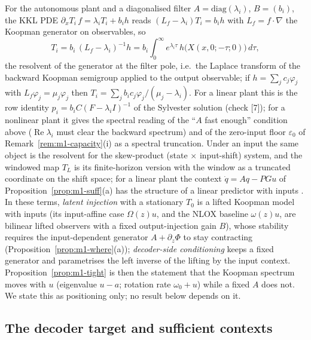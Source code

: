 \begin{remark}\label{rem:m1-koopman}
For the autonomous plant and a diagonalised filter $A=\mathrm{diag}(\lambda_i)$, $B=(b_i)$, the KKL PDE
$\partial_xT_i\,f=\lambda_iT_i+b_ih$ reads $(L_f-\lambda_i)T_i=b_ih$ with $L_f=f\cdot\nabla$ the Koopman generator on
observables, so
\[
T_i=b_i\,(L_f-\lambda_i)^{-1}h=b_i\int_0^\infty e^{\lambda_i\tau}\,h\big(X(x,0;-\tau;0)\big)\,d\tau ,
\]
the resolvent of the generator at the filter pole, i.e.\ the Laplace transform of the backward Koopman semigroup
applied to the output observable; if $h=\sum_jc_j\varphi_j$ with $L_f\varphi_j=\mu_j\varphi_j$ then
$T_i=\sum_jb_ic_j\varphi_j/(\mu_j-\lambda_i)$. For a linear plant this is the row identity
$p_i=b_iC(F-\lambda_iI)^{-1}$ of the Sylvester solution (check [7]); for a nonlinear plant it gives the spectral
reading of the ``$A$ fast enough'' condition above ($\operatorname{Re}\lambda_i$ must clear the backward spectrum) and of
the zero-input floor $\varepsilon_0$ of Remark~\ref{rem:m1-capacity}(i) as a spectral truncation. Under an input the
same object is the resolvent for the skew-product (state $\times$ input-shift) system, and the windowed map $T_L$ is its
finite-horizon version with the window as a truncated coordinate on the shift space; for a linear plant the context
$\dot q=Aq-PGu$ of Proposition~\ref{prop:m1-suff}(a) has the structure of a linear predictor with inputs
\citep{proctor2016dmdc,korda2018linear}. In these terms, \emph{latent injection} with a stationary $T_0$ is a lifted
Koopman model with inputs (its input-affine case $\Omega(z)u$, and the NLOX baseline $\omega(z)u$, are bilinear lifted
observers with a fixed output-injection gain $B$), whose stability requires the input-dependent generator $A+\partial_z\Phi$
to stay contracting (Proposition~\ref{prop:m1-where}(a)); \emph{decoder-side conditioning} keeps a fixed generator and
parametrises the left inverse of the lifting by the input context. Proposition~\ref{prop:m1-tight} is then the
statement that the Koopman spectrum moves with $u$ (eigenvalue $u-a$; rotation rate $\omega_0+u$) while a fixed $A$ does
not. We state this as positioning only; no result below depends on it.
\end{remark}

\subsection{The decoder target and sufficient contexts}

